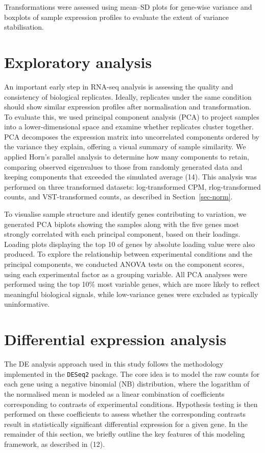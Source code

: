 \documentclass[
  a4paper,
]{scrreprt}
\begin{document}
Transformations were assessed using mean--SD plots for gene-wise
variance and boxplots of sample expression profiles to evaluate the
extent of variance stabilisation.

\section{Exploratory analysis}\label{seq-eda}

An important early step in RNA-seq analysis is assessing the quality and
consistency of biological replicates. Ideally, replicates under the same
condition should show similar expression profiles after normalisation
and transformation. To evaluate this, we used principal component
analysis (PCA) to project samples into a lower-dimensional space and
examine whether replicates cluster together. PCA decomposes the
expression matrix into uncorrelated components ordered by the variance
they explain, offering a visual summary of sample similarity. We applied
Horn's parallel analysis to determine how many components to retain,
comparing observed eigenvalues to those from randomly generated data and
keeping components that exceeded the simulated average (14). This
analysis was performed on three transformed datasets: log-transformed
CPM, rlog-transformed counts, and VST-transformed counts, as described
in Section~\ref{sec-norm}.

To visualise sample structure and identify genes contributing to
variation, we generated PCA biplots showing the samples along with the
five genes most strongly correlated with each principal component, based
on their loadings. Loading plots displaying the top 10 of genes by
absolute loading value were also produced. To explore the relationship
between experimental conditions and the principal components, we
conducted ANOVA tests on the component scores, using each experimental
factor as a grouping variable. All PCA analyses were performed using the
top 10\% most variable genes, which are more likely to reflect
meaningful biological signals, while low-variance genes were excluded as
typically uninformative.

\section{Differential expression analysis}\label{sec-de}

The DE analysis approach used in this study follows the methodology
implemented in the \texttt{DESeq2} package. The core idea is to model
the raw counts for each gene using a negative binomial (NB)
distribution, where the logarithm of the normalised mean is modeled as a
linear combination of coefficients corresponding to contrasts of
experimental conditions. Hypothesis testing is then performed on these
coefficients to assess whether the corresponding contrasts result in
statistically significant differential expression for a given gene. In
the remainder of this section, we briefly outline the key features of
this modeling framework, as described in (12).
\end{document}
